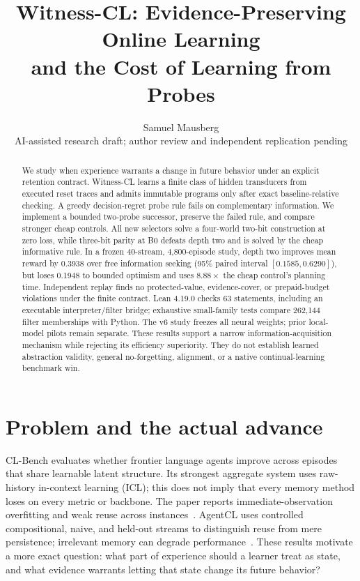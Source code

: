 \documentclass[10pt,twocolumn]{article}
\title{\vspace{-1.2em}\textbf{Witness-CL: Evidence-Preserving Online Learning\\and the Cost of Learning from Probes}}
\author{Samuel Mausberg\\\small AI-assisted research draft; author review and independent replication pending}
\date{}
\begin{document}
\raggedbottom
\maketitle
\begin{abstract}
We study when experience warrants a change in future behavior under an explicit
retention contract. Witness-CL learns a finite class of hidden transducers from
executed reset traces and admits immutable programs only after exact
baseline-relative checking. A greedy decision-regret probe rule fails on
complementary information. We implement a bounded two-probe successor, preserve
the failed rule, and compare stronger cheap controls. All new selectors solve a
four-world two-bit construction at zero loss, while three-bit parity at B0 defeats
depth two and is solved by the cheap informative rule. In a frozen 40-stream,
4,800-episode study, depth two improves mean reward by 0.3938 over free
information seeking (95\% paired interval $[0.1585,0.6290]$), but loses 0.1948 to
bounded optimism and uses $8.88\times$ the cheap control's planning time.
Independent replay finds no protected-value, evidence-cover, or prepaid-budget
violations under the finite contract. Lean 4.19.0 checks 63 statements, including
an executable interpreter/filter bridge; exhaustive small-family tests compare
262,144 filter memberships with Python. The v6 study freezes all neural weights;
prior local-model pilots remain separate. These results support a narrow
information-acquisition mechanism while rejecting its efficiency superiority.
They do not establish learned abstraction validity, general no-forgetting,
alignment, or a native continual-learning benchmark win.
\end{abstract}

\section{Problem and the actual advance}
CL-Bench evaluates whether frontier language agents improve across episodes that
share learnable latent structure. Its strongest aggregate system uses raw-history in-context learning (ICL);
this does not imply that every memory method loses on every metric or backbone.
The paper reports immediate-observation overfitting and weak reuse across
instances~\cite{clbench}.
AgentCL uses controlled compositional, naive, and held-out streams to distinguish
reuse from mere persistence; irrelevant memory can degrade performance~\cite{agentcl}.
These results motivate a more exact question: what part of experience should a
learner treat as state, and what evidence warrants letting that state change its
future behavior?
\end{document}
